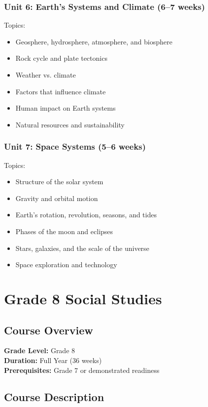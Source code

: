 \documentclass[11pt,letterpaper]{report}
\begin{document}
\subsection{Unit 6: Earth’s Systems and Climate (6–7 weeks)}

Topics:
\begin{itemize}
\item Geosphere, hydrosphere, atmosphere, and biosphere
\item Rock cycle and plate tectonics
\item Weather vs. climate
\item Factors that influence climate
\item Human impact on Earth systems
\item Natural resources and sustainability
\end{itemize}

\subsection{Unit 7: Space Systems (5–6 weeks)}

Topics:
\begin{itemize}
\item Structure of the solar system
\item Gravity and orbital motion
\item Earth’s rotation, revolution, seasons, and tides
\item Phases of the moon and eclipses
\item Stars, galaxies, and the scale of the universe
\item Space exploration and technology
\end{itemize}


\chapter{Grade 8 Social Studies}

\section{Course Overview}

\textbf{Grade Level:} Grade 8\\
\textbf{Duration:} Full Year (36 weeks)\\
\textbf{Prerequisites:} Grade 7 or demonstrated readiness

\section{Course Description}
\end{document}
